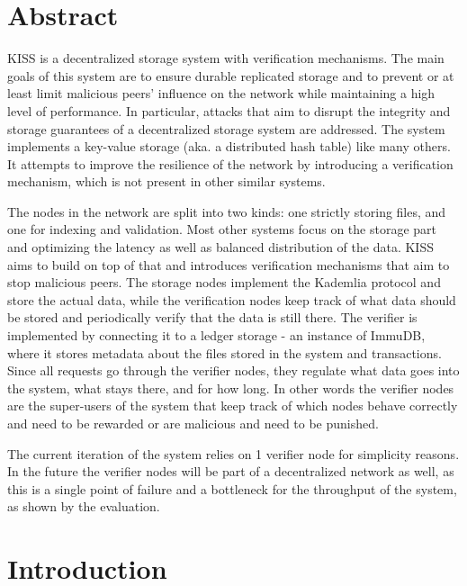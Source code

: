 \documentclass[ twoside,openright,titlepage,numbers=noenddot,headinclude,%
                footinclude=true,cleardoublepage=empty,abstractoff, %
                BCOR=5mm,paper=a4,fontsize=11pt,%
                ngerman,american,%
                ]{scrreprt}
\begin{document}
\raggedbottom
{} %
\pagestyle{plain}

\begingroup

\chapter*{Abstract}
KISS is a decentralized storage system with verification mechanisms.
The main goals of this system are to ensure durable replicated storage and to prevent
or at least limit malicious peers' influence on the network while maintaining a high level of performance.
In particular, attacks that aim to disrupt the integrity and
storage guarantees of a decentralized storage system are addressed.
The system implements a key-value storage (aka. a distributed hash table) like many others.
It attempts to improve the resilience of the network by introducing a verification mechanism,
which is not present in other similar systems.

The nodes in the network are split into two kinds: one strictly storing files,
and one for indexing and validation.
Most other systems focus on the storage part and optimizing the latency as well as balanced distribution
of the data.
KISS aims to build on top of that and introduces verification mechanisms that aim to stop malicious peers.
The storage nodes implement the Kademlia protocol and store the actual data,
while the verification nodes keep track of what data should be stored and periodically
verify that the data is still there.
The verifier is implemented by connecting it to a ledger storage - an instance of ImmuDB,
where it stores metadata about the files stored in the system and transactions.
Since all requests go through the verifier nodes, they regulate what data goes into the system, 
what stays there, and for how long.
In other words the verifier nodes are the super-users of the system that keep track of which
nodes behave correctly and need to be rewarded or are malicious and need to be punished.

The current iteration of the system relies on 1 verifier node for simplicity reasons.
In the future the verifier nodes will be part of a decentralized network as well, 
as this is a single point of failure and a bottleneck for the throughput of the system,
as shown by the evaluation.



\vfill
\endgroup			

\chapter{Introduction}
\end{document}
